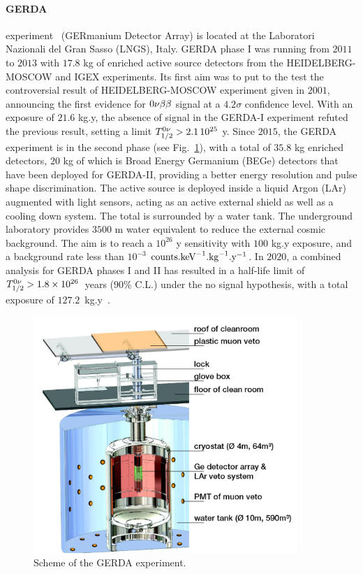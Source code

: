 \paragraph{GERDA} experiment~\cite{art:NEXT_2018} (GERmanium Detector Array) is located at the Laboratori Nazionali del Gran Sasso (LNGS), Italy.
GERDA phase I was running from $2011$ to $2013$ with $17.8$ kg of enriched active source detectors from the HEIDELBERG-MOSCOW and IGEX experiments.
Its first aim was to put to the test the controversial result of HEIDELBERG-MOSCOW experiment given in $2001$, announcing the first evidence for $0\nu\beta\beta$ signal at a $4.2\sigma$ confidence level.
With an exposure of $21.6$ kg.y, the absence of signal in the GERDA-I experiment refuted the previous result, setting a limit $T_{1/2}^{0\nu}>2.1\, 10^{25}$ y.
Since $2015$, the GERDA experiment is in the second phase (see Fig.~\ref{fig:GERDA}), with a total of $35.8$ kg enriched detectors, $20$ kg of which is Broad Energy Germanium (BEGe) detectors that have been deployed for GERDA-II, providing a better energy resolution and pulse shape discrimination.
The active source is deployed inside a liquid Argon (LAr) augmented with light sensors, acting as an active external shield as well as a cooling down system.
The total is surrounded by a water tank.
The underground laboratory provides $3500$ m water equivalent to reduce the external cosmic background.
The aim is to reach a $10^{26}$ y sensitivity with $100$ kg.y exposure, and a background rate less than $10^{-3}$ $\text{counts.keV}^{-1}\text{.kg}^{-1}\text{.y}^{-1}$.
In $2020$, a combined analysis for GERDA phases I and II has resulted in a half-life limit of $T_{1/2}^{0\nu}>1.8\times 10^{26}$~years ($90$\% C.L.) under the no signal hypothesis, with a total exposure of $127.2$~kg.y~\cite{art:GERDA_2020}.

\begin{figure}
  \centering
  \includegraphics[width=10cm]{neutrinophysics/fig_neutrinophysics/GERDA.png}
  \caption{Scheme of the GERDA experiment.
    \label{fig:GERDA}}
\end{figure}


